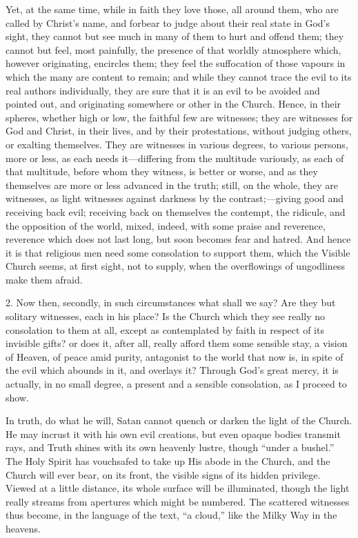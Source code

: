 Yet, at the same time, while in faith they love those, all around
them, who are called by Christ's name, and forbear to judge about
their real state in God's sight, they cannot but see much in many of
them to hurt and offend them; they cannot but feel, most painfully,
the presence of that worldly atmosphere which, however originating,
encircles them; they feel the suffocation of those vapours in which
the many are content to remain; and while they cannot trace the evil
to its real authors individually, they are sure that it is an evil to
be avoided and pointed out, and originating somewhere or other in the
Church. Hence, in their spheres, whether high or low, the faithful few
are witnesses; they are witnesses for God and Christ, in their lives,
and by their protestations, without judging others, or exalting
themselves. They are witnesses in various degrees, to various persons,
more or less, as each needs it—differing from the multitude
variously, as each of that multitude, before whom they witness, is
better or worse, and as they themselves are more or less advanced in
the truth; still, on the whole, they are witnesses, as light witnesses
against darkness by the contrast;—giving good and receiving back
evil; receiving back on themselves the contempt, the ridicule, and the
opposition of the world, mixed, indeed, with some praise and
reverence, reverence which does not last long, but soon becomes fear
and hatred. And hence it is that religious men need some consolation
to support them, which the Visible Church seems, at first sight, not
to supply, when the overflowings of ungodliness make them afraid.

2. Now then, secondly, in such circumstances what shall we say? Are
they but solitary witnesses, each in his place? Is the Church which
they see really no consolation to them at all, except as contemplated
by faith in respect of its invisible gifts? or does it, after all,
really afford them some sensible stay, a vision of Heaven, of peace
amid purity, antagonist to the world that now is, in spite of the evil
which abounds in it, and overlays it? Through God's great mercy, it
is actually, in no small degree, a present and a sensible consolation,
as I proceed to show.

In truth, do what he will, Satan cannot quench or darken the light
of the Church. He may incrust it with his own evil creations, but even
opaque bodies transmit rays, and Truth shines with its own heavenly
lustre, though ``under a bushel.'' The Holy Spirit has
vouchsafed to take up His abode in the Church, and the Church will
ever bear, on its front, the visible signs of its hidden privilege.
Viewed at a little distance, its whole surface will be illuminated,
though the light really streams from apertures which might be
numbered. The scattered witnesses thus become, in the language of the
text, ``a cloud,'' like the Milky Way in the heavens.

